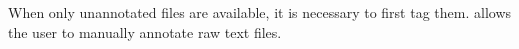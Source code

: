 \documentclass[manual-fr.tex]{subfiles}
\begin{document}
When only unannotated files are available, it is necessary to first tag them. \SEM allows the user to manually annotate raw text files.
\end{document}
